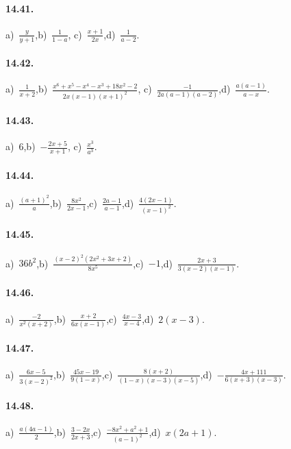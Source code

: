 \paragraph{14.41.}
a)~$\frac{y}{y+1}$,\quad b)~$\frac{1}{1-a}$, \quad c)~$\frac{x+1}{2x}$,\quad d)~$\frac{1}{a-2}$.

\paragraph{14.42.}
a)~$\frac{1}{x+2}$,\quad b)~$\frac{x^{6}+x^{5}-x^{4}-x^{3}+18x^{2}-2}{2x(x-1)(x+1)^{2}}$, \quad c)~$\frac{-1}{2a(a-1)(a-2)}$,\quad d)~$\frac{a(a-1)}{a-x}$.

\paragraph{14.43.}
a)~$6$,\quad b)~$-\frac{2x+5}{x+1}$, \quad c)~$\frac{x^{3}}{a^{3}}$.

\paragraph{14.44.}
a)~$\frac{(a+1)^{2}}{a}$,\quad b)~$\frac{8x^{2}}{2x-1}$,\quad c)~$\frac{2a-1}{a-1}$,\quad d)~$\frac{4(2x-1)}{(x-1)^{2}}$.

\paragraph{14.45.}
a)~$36b^{2}$,\quad b)~$\frac{(x-2)^{2}(2x^{2}+3x+2)}{8x^{5}}$,\quad c)~$-1$,\quad d)~$\frac{2x+3}{3(x-2)(x-1)}$.

\paragraph{14.46.}
a)~$\frac{-2}{x^{2}(x+2)}$,\quad b)~$\frac{x+2}{6x(x-1)}$,\quad c)~$\frac{4x-3}{x-4}$,\quad d)~$2(x-3)$.

\paragraph{14.47.}
a)~$\frac{6x-5}{3(x-2)^{2}}$,\quad b)~$\frac{45x-19}{9(1-x)}$,\quad c)~$\frac{8(x+2)}{(1-x)(x-3)(x-5)}$,\quad d)~$-\frac{4x+111}{6(x+3)(x-3)}$.

\paragraph{14.48.}
a)~$\frac{a(4a-1)}{2}$,\quad b)~$\frac{3-2x}{2x+3}$,\quad c)~$\frac{-8x^2+a^2+1}{(a-1)^2}$,\quad d)~$x(2a+1)$.

